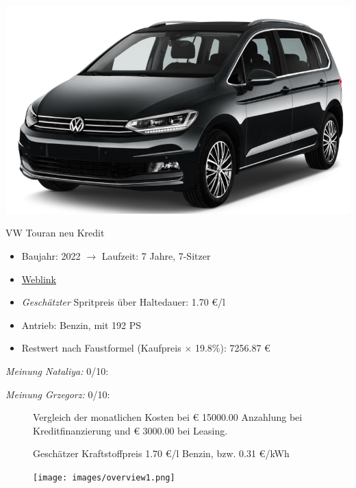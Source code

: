 \documentclass[landscape, DIV=99, 14pt]{scrartcl}
\begin{document}
\pagebreak
\begin{center}
\includegraphics[width=0.9\columnwidth]{cars/vw-touran.png}

VW Touran neu Kredit
\end{center}

\begin{itemize}
    \item Baujahr: 2022 $\rightarrow$ Laufzeit: 7 Jahre, 7-Sitzer
    \item \href{https://konfigurator.meinauto.de/volkswagen/neuwagen/8-touran/angebote/touran-active/konfigurator/\#!/preisvergleich/active/8864470/16,32,40,44,47,55,56,70,78,80/private/111369-2923-297336/4629/61ef049598ad9/cash-purchase/107670-6554-286080/48,0,10000,0,0,0,0,0,}{Weblink}
    \item \emph{Gesch\"atzter} Spritpreis \"uber Haltedauer: 1.70 \euro{}/l
    \item Antrieb: Benzin, mit 192 PS
    \item Restwert nach Faustformel (Kaufpreis $\times$ 19.8\%): 7256.87 \euro{}
\end{itemize}

\begin{small}
\emph{Meinung Nataliya:} 0/10: 
        
\emph{Meinung Grzegorz:} 0/10: 
\end{small}

\pagebreak



\pagebreak

\onecolumn
\begin{figure}
\centering
Vergleich der monatlichen Kosten bei \euro{} 15000.00 Anzahlung bei Kreditfinanzierung und \euro{} 3000.00 bei Leasing.

Gesch\"atzer Kraftstoffpreis 1.70 \euro{}/l Benzin, bzw. 0.31 \euro{}/kWh


\vspace{1em}
\texttt{[image: images/overview1.png]}
\end{figure}
\vfill 
\end{document}
